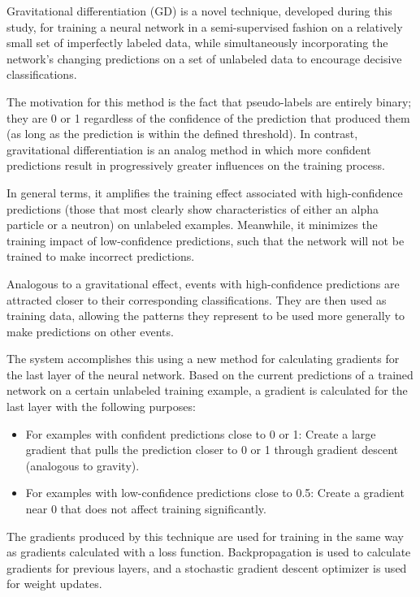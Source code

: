 \documentclass[10pt]{article}
\begin{document}
Gravitational differentiation (GD) is a novel technique, developed during this study, for training a neural network in a semi-supervised fashion on a relatively small set of imperfectly labeled data, while simultaneously incorporating the network's changing predictions on a set of unlabeled data to encourage decisive classifications.

The motivation for this method is the fact that pseudo-labels are entirely binary; they are 0 or 1 regardless of the confidence of the prediction that produced them (as long as the prediction is within the defined threshold). In contrast, gravitational differentiation is an analog method in which more confident predictions result in progressively greater influences on the training process.

In general terms, it amplifies the training effect associated with high-confidence predictions (those that most clearly show characteristics of either an alpha particle or a neutron) on unlabeled examples. Meanwhile, it minimizes the training impact of low-confidence predictions, such that the network will not be trained to make incorrect predictions.

Analogous to a gravitational effect, events with high-confidence predictions are attracted closer to their corresponding classifications. They are then used as training data, allowing the patterns they represent to be used more generally to make predictions on other events.

The system accomplishes this using a new method for calculating gradients for the last layer of the neural network. Based on the current predictions of a trained network on a certain unlabeled training example, a gradient is calculated for the last layer with the following purposes:

\begin{itemize}
    \item For examples with confident predictions close to 0 or 1: Create a large gradient that pulls the prediction closer to 0 or 1 through gradient descent (analogous to gravity).
    \item For examples with low-confidence predictions close to 0.5: Create a gradient near 0 that does not affect training significantly.
\end{itemize}

The gradients produced by this technique are used for training in the same way as gradients calculated with a loss function. Backpropagation is used to calculate gradients for previous layers, and a stochastic gradient descent optimizer \cite{sgd} is used for weight updates.
\end{document}
